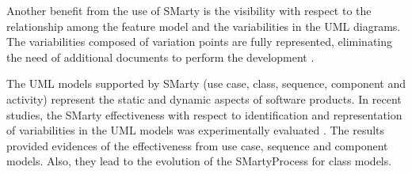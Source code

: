 Another benefit from the use of SMarty is the visibility with respect to the relationship among the feature model and the variabilities in the UML diagrams. The variabilities composed of variation points are fully represented, eliminating the need of additional documents to perform the development \cite{oliveirajr10}.


The UML models supported by SMarty (use case, class, sequence, component and activity) represent the static and dynamic aspects of software products.  In recent studies, the SMarty effectiveness with respect to identification and representation of variabilities in the UML models was experimentally evaluated \cite{marcolino13, marcolino14a, marcolino14b, bera15}. The results provided evidences of the effectiveness from use case, sequence and component models. Also, they lead to the evolution of the SMartyProcess for class models.







